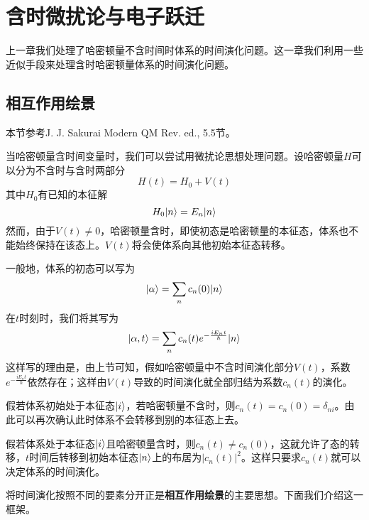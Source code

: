 
\chapter{含时微扰论与电子跃迁}
\label{cpt:2}
上一章我们处理了哈密顿量不含时间时体系的时间演化问题。这一章我们利用一些近似手段来处理含时哈密顿量体系的时间演化问题。
\section{相互作用绘景}
\begin{framed}
	本节参考J. J. Sakurai Modern QM Rev. ed., 5.5节。
\end{framed}
当哈密顿量含时间变量时，我们可以尝试用微扰论思想处理问题。设哈密顿量$ H $可以分为不含时与含时两部分
\begin{equation}\label{key}
H(t)=H_0+V(t)
\end{equation}
其中$ H_0 $有已知的本征解
\begin{equation}\label{key}
H_0|n\rangle=E_n|n\rangle
\end{equation}
然而，由于$ V(t)\neq 0 $，哈密顿量含时，即使初态是哈密顿量的本征态，体系也不能始终保持在该态上。$ V(t) $将会使体系向其他初始本征态转移。

一般地，体系的初态可以写为
\begin{equation}\label{key}
|\alpha\rangle=\sum_nc_n(0)|n\rangle
\end{equation}
在$ t $时刻时，我们将其写为
\begin{equation}\label{key}
|\alpha,t\rangle=\sum_nc_n(t)e^{-\frac{iE_nt}{\hbar}}|n\rangle
\end{equation}
这样写的理由是，由上节可知，假如哈密顿量中不含时间演化部分$ V(t) $，系数$ e^{-\frac{iE_nt}{\hbar}} $依然存在；这样由$ V(t) $导致的时间演化就全部归结为系数$ c_n(t) $的演化。

假若体系初始处于本征态$ |i\rangle $，若哈密顿量不含时，则$ c_n(t)=c_n(0)=\delta_{ni} $。由此可以再次确认此时体系不会转移到别的本征态上去。

假若体系处于本征态$ |i\rangle $且哈密顿量含时，则$ c_n(t)\neq c_n(0)$，这就允许了态的转移，$ t $时间后转移到初始本征态$ |n\rangle $上的布居为$ |c_n(t)|^2 $。这样只要求$ c_n(t) $就可以决定体系的时间演化。

将时间演化按照不同的要素分开正是\textbf{相互作用绘景}的主要思想。下面我们介绍这一框架。

